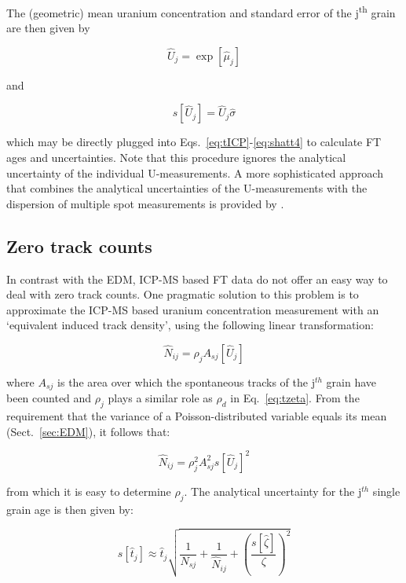 \documentclass{article}
\begin{document}
The (geometric) mean uranium concentration and standard error of the
j\textsuperscript{th} grain are then given by

\begin{equation}
\hat{U}_j = \exp[\hat{\mu}_j]
\end{equation}

and

\begin{equation}
s[\hat{U}_j] = \hat{U}_j \hat{\sigma}
\end{equation}

which may be directly plugged into Eqs.~\ref{eq:tICP}-\ref{eq:shatt4}
to calculate FT ages and uncertainties. Note that this procedure
ignores the analytical uncertainty of the individual U-measurements. A
more sophisticated approach that combines the analytical uncertainties
of the U-measurements with the dispersion of multiple spot
measurements is provided by \citet{vermeesch2017}.

\subsection{Zero track counts}
\label{sec:zeroICP}

In contrast with the EDM, ICP-MS based FT data do not offer an easy
way to deal with zero track counts. One pragmatic solution to this
problem is to approximate the ICP-MS based uranium concentration
measurement with an `equivalent induced track density', using the
following linear transformation:

\begin{equation}
\hat{N}_{ij} = \rho_j A_{sj} [\hat{U}_j]
\end{equation}

where $A_{sj}$ is the area over which the spontaneous tracks of the
j$^{th}$ grain have been counted and $\rho_j$ plays a similar role as
$\rho_d$ in Eq.~\ref{eq:tzeta}. From the requirement that the variance
of a Poisson-distributed variable equals its mean
(Sect.~\ref{sec:EDM}), it follows that:

\begin{equation}
\hat{N}_{ij} = \rho_j^2 A_{sj}^2 s[\hat{U}_j]^2
\end{equation}

from which it is easy to determine $\rho_j$. The analytical uncertainty
for the j$^{th}$ single grain age is then given by:

\begin{equation}
  s[\hat{t}_j] \approx \hat{t}_j \sqrt{\frac{1}{N_{sj}} +
    \frac{1}{\hat{N}_{ij}} +
    \left(\frac{s[\hat{\zeta}]}{\zeta}\right)^2}
  \label{eq:shattPseudoZeta}
\end{equation}
\end{document}
